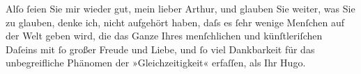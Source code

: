 \pstart
           Alſo{ }ſeien Sie mir wieder gut, mein lieber Arthur, und glauben Sie weiter, was Sie
                  {\pb}zu glauben, denke ich, nicht
               aufgehört haben, daſs es{ }ſehr wenige Menſchen auf der Welt geben wird, die das Ganze
               Ihres menſchlichen und künſtleriſchen Daſeins mit{ }ſo großer Freude und Liebe, und{ }ſo
               viel Dankbarkeit für das unbegreifliche Phänomen der »Gleichzeitigkeit« erfaſſen, als
               Ihr\pend
           \pstart \spacefill\mbox{Hugo.}\pend{}\endnumbering{}  \newcommand{\dateiname}{L01978}\newcommand{\titel}{Hugo von Hofmannsthal an Arthur Schnitzler, 7. 11. 1910}\newcommand{\editorInnen}{Martin Anton Müller und Gerd-Hermann Susen}
